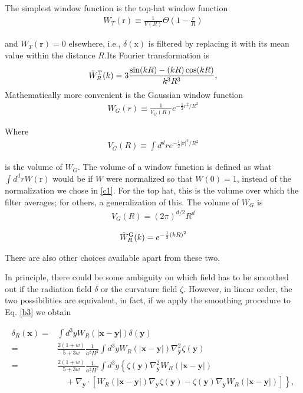 \begin{appendices}
The simplest window function is the top-hat window function
\begin{align}
    W_T(\mathrm{r}) \equiv \frac{1}{V(R)} \Theta\left(1-\frac{r}{R}\right)\label{c10}
\end{align}

and $W_T(\mathbf{r})=0$ elsewhere, i.e., $\delta(\mathrm{x})$ is filtered by replacing it with its mean value within the distance $R$.Its Fourier transformation is
\begin{align}
      \Tilde{W}_{R}^{\text {T}}(k)=3 \frac{\sin (k R)-(k R) \cos (k R)}{k^{3} R^{3}},
\end{align}
Mathematically more convenient is the Gaussian window function
\begin{align}
    W_G(r) \equiv \frac{1}{V_G(R)} e^{-\frac{1}{2} r^2 / R^2}\label{c11}
\end{align}

Where
\begin{align}
    V_G(R) \equiv \int d^d r e^{-\frac{1}{2}|\mathbf{r}|^2 / R^2}
\end{align}

is the volume of $W_G$. The volume of a window function is defined as what $\int d^d r W(\mathrm{r})$ would be if $W$ were normalized so that $W(0)=1$, instead of the normalization we chose in \ref{c1}. For the top hat, this is the volume over which the filter averages; for others, a generalization of this.
The volume of $W_G$ is 
\begin{align}
    V_G(R)=(2 \pi)^{d / 2} R^d
\end{align}

\begin{align}
    \Tilde{W}_{R}^{\text {G}}(k)=e^{-\frac{1}{2}(k R)^2}
\end{align}


There are also other choices available apart from these two.

In principle, there could be some ambiguity on which field has to be smoothed out if the radiation field $\delta$ or the curvature field $\zeta$. However, in linear order, the two possibilities are equivalent, in fact, if we apply the smoothing procedure to Eq. \ref{b3} we obtain

\begin{align}
    \delta_{R}(\mathbf{x})= & \int d^{3} y W_{R}(|\mathbf{x}-\mathbf{y}|) \delta(\mathbf{y}) \\
    = & \frac{2(1+w)}{5+3 w} \frac{1}{a^{2} H^{2}} \int d^{3} y W_{R}(|\mathbf{x}-\mathbf{y}|) \nabla_{\mathbf{y}}^{2} \zeta(\mathbf{y}) \\
    = & \frac{2(1+w)}{5+3 w} \frac{1}{a^{2} H^{2}} \int d^{3} y\left\{\zeta(\mathbf{y}) \nabla_{\mathbf{y}}^{2} W_{R}(|\mathbf{x}-\mathbf{y}|)\right. \\
    & \left.\quad+\nabla_{\mathbf{y}} \cdot\left[W_{R}(|\mathbf{x}-\mathbf{y}|) \nabla_{\mathbf{y}} \zeta(\mathbf{y})-\zeta(\mathbf{y}) \nabla_{\mathbf{y}} W_{R}(|\mathbf{x}-\mathbf{y}|)\right]\right\},
\end{align}


\end{appendices}
